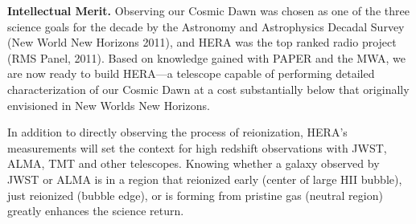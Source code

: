 \documentclass[preprint]{aastex}
\def\HI{{H{\small I }}}
\def\HII{{H{\small II }}}
\begin{document}

\vspace{.25 cm}
\noindent
{\bf Intellectual Merit.}
%
Observing our Cosmic Dawn was chosen as one of the three science goals for the decade by the Astronomy and Astrophysics Decadal Survey (New World New Horizons 2011), and HERA was the top ranked radio project (RMS Panel, 2011). Based on knowledge gained with PAPER and the MWA, we are now ready to build HERA---a telescope
capable of performing detailed characterization of our Cosmic Dawn at
a cost substantially below that originally envisioned in New Worlds New Horizons. 

In addition to directly observing the process of reionization, HERA's measurements will set the context for high redshift observations with JWST, ALMA, TMT and other telescopes. Knowing whether a galaxy observed by JWST or ALMA is in a region that reionized early (center of large \HII bubble), just reionized (bubble edge), or is forming from pristine gas (neutral region) greatly enhances the science return.

\end{document}

